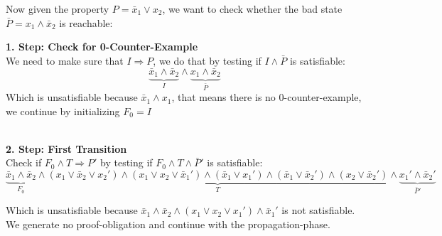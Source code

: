 \documentclass[11pt, a4paper, BCOR=10mm, ngerman, oneside]{scrbook}
\begin{document}
Now given the property $P = \bar x_1 \lor x_2$, we want to check whether the bad state $\bar P = x_1 \land \bar x_2$ is reachable: \\ \par

\textbf{1. Step: Check for 0-Counter-Example} \\ 
We need to make sure that $I \Rightarrow P$, we do that by testing if $I \land \bar P$ is satisfiable: 
\begin{equation*}
\underbrace{\bar x_1 \land \bar x_2}_{I} \land \underbrace{x_1 \land \bar x_2}_{\bar P}
\end{equation*}
Which is unsatisfiable because $\bar x_1 \land x_1$, that means there is no 0-counter-example, we continue by initializing $F_0 = I$\\ \\ \par

\textbf{2. Step: First Transition} \\
Check if $F_0 \land T \Rightarrow P'$ by testing if $F_0 \land T \land \bar P'$ is satisfiable:
\begin{equation*}
\underbrace{\bar x_1 \land \bar x_2}_{F_0} \land \underbrace{( x_1 \lor \bar x_2 \lor x_2') \land (x_1 \lor x_2 \lor \bar x_1') \land (\bar x_1 \lor x_1') \land (\bar x_1 \lor \bar x_2') \land (x_2 \lor \bar x_2')}_{T} \land \underbrace{x_1' \land \bar x_2'}_{\bar P'}
\end{equation*}

Which is unsatisfiable because $\bar x_1 \land \bar x_2 \land (x_1 \lor x_2 \lor x_1') \land \bar x_1'$ is not satisfiable. We generate no proof-obligation and continue with the propagation-phase. \\ \\
\end{document}
